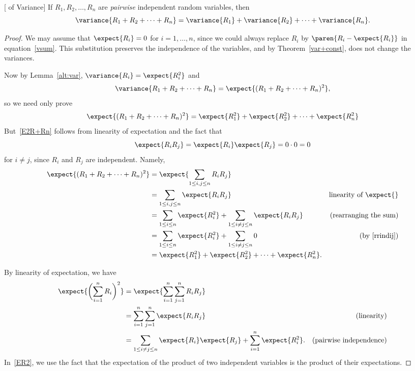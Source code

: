 \begin{theorem}\label{thm:variance_additivity}
[ of Variance] If $R_1, R_2,
\dots, R_n$ are  \emph{pairwise}
independent random variables, then
\begin{equation}\label{vsum}
\variance{R_1 + R_2 + \cdots + R_n} = \variance{R_1} + \variance{R_2} +
  \cdots + \variance{R_n}.
\end{equation}
\end{theorem}
\begin{editingnotes}

\begin{proof}
  We may assume that $\expect{R_i} = 0$ for $i=1,\dots,n$, since we could
  always replace $R_i$ by $\paren{R_i-\expect{R_i}}$ in
  equation~\eqref{vsum}.  This substitution preserves the independence of
  the variables, and by Theorem~\ref{var+const}, does not change the
  variances.

  Now by Lemma~\ref{alt:var}, $\variance{R_i} = \expect{R_i^2}$ and
\[
\variance{R_1+R_2+\cdots+R_n} = \expect{(R_1+R_2+\cdots+R_n)^2},
\]
so we need only prove
\begin{equation}\label{E2R+Rn}
\expect{(R_1+R_2+\cdots+R_n)^2} = \expect{R_1^2} + \expect{R_2^2} + \cdots
+ \expect{R_n^2}
\end{equation}
But~\eqref{E2R+Rn} follows from linearity of expectation and the fact that
\begin{equation}\label{rrindij}
\expect{R_iR_j} = \expect{R_i}\expect{R_j} = 0 \cdot 0 = 0
\end{equation}
for $i \neq j$, since $R_i$ and $R_j$ are independent.  Namely,
\begin{align*}
\expect{(R_1+R_2+\cdots+R_n)^2}
   & = \expect{\sum_{1\leq i,j \leq n} R_iR_j}\\
   & = \sum_{1\leq i,j \leq n} \expect{R_iR_j} & \text{linearity of $\expect{}$}\\
   & = \sum_{1 \leq i \leq n} \expect{R_i^2}
             + \sum_{1 \leq i \neq j \leq n} \expect{R_iR_j} &
             \text{(rearranging the sum)}\\
   & = \sum_{1 \leq i \leq n} \expect{R_i^2}
            + \sum_{1 \leq i \neq j \leq n} 0
             & \text{(by~\eqref{rrindij})}\\
   & =  \expect{R_1^2} + \expect{R_2^2} + \cdots + \expect{R_n^2}.
\end{align*}


\iffalse
By linearity of expectation, we have
\begin{align}
\expect{\biggl(\sum_{i=1}^n R_i\biggr)^2} &
    = \expect{\sum_{i=1}^n \sum_{j=1}^n R_i R_j} \notag\\
   &  = \sum_{i=1}^n \sum_{j=1}^n \expect{R_i R_j} & \text{(linearity)}\notag\\
   & = \sum_{1\le i \neq j \le n} \expect{R_i}\expect{R_j} + \sum_{i=1}^n
     \expect{R_i^2}.
       & \text{(pairwise independence)} \label{ER2}
\end{align}
In~\eqref{ER2}, we use the fact that the expectation
of the product of two independent variables is the product of their
expectations.


\end{proof}
\end{editingnotes}
